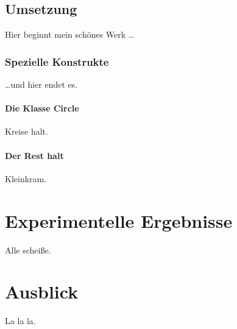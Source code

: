 \documentclass[a4paper,twoside]{report}
\theoremstyle{plain}
\theoremstyle{definition}
\begin{document}
\section{Umsetzung} \label{prog}
Hier beginnt mein schönes Werk \ldots

\subsection{Spezielle Konstrukte}
\ldots und hier endet es.

\subsubsection{Die Klasse Circle}
Kreise halt.\cite{NSAbook}

\subsubsection{Der Rest halt}
Kleinkram.

\newpage
\chapter{Experimentelle Ergebnisse}
Alle scheiße.

\newpage
\chapter{Ausblick}
La la la.

{}

\end{document}

